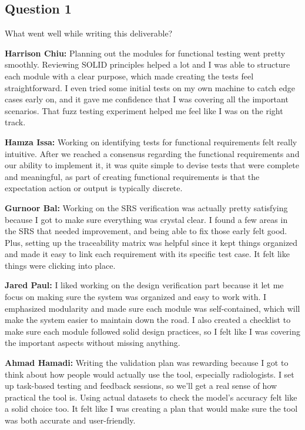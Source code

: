 \documentclass[12pt, titlepage]{article}
\begin{document}
\subsection{Question 1}
What went well while writing this deliverable?

\textbf{Harrison Chiu:}  Planning out the modules for functional testing went pretty smoothly. Reviewing SOLID principles helped a lot and I was able to structure each module with a clear purpose, which made creating the tests feel straightforward. I even tried some initial tests on my own machine to catch edge cases early on, and it gave me confidence that I was covering all the important scenarios. That fuzz testing experiment helped me feel like I was on the right track.

\textbf{Hamza Issa:} Working on identifying tests for functional requirements felt really intuitive. After we reached a consensus regarding the functional requirements and our ability to implement it, it was quite simple to devise tests that were complete and meaningful, as part of creating functional requirements is that the expectation action or output is typically discrete.

\textbf{Gurnoor Bal:} Working on the SRS verification was actually pretty satisfying because I got to make sure everything was crystal clear. I found a few areas in the SRS that needed improvement, and being able to fix those early felt good. Plus, setting up the traceability matrix was helpful since it kept things organized and made it easy to link each requirement with its specific test case. It felt like things were clicking into place.

\textbf{Jared Paul:} I liked working on the design verification part because it let me focus on making sure the system was organized and easy to work with. I emphasized modularity and made sure each module was self-contained, which will make the system easier to maintain down the road. I also created a checklist to make sure each module followed solid design practices, so I felt like I was covering the important aspects without missing anything.

\textbf{Ahmad Hamadi:} Writing the validation plan was rewarding because I got to think about how people would actually use the tool, especially radiologists. I set up task-based testing and feedback sessions, so we’ll get a real sense of how practical the tool is. Using actual datasets to check the model’s accuracy felt like a solid choice too. It felt like I was creating a plan that would make sure the tool was both accurate and user-friendly.
\end{document}
